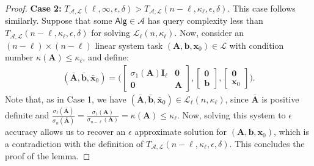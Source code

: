 \documentclass[10pt,a4paper]{amsart}
\def\Ac{{\mathcal A}}
\def\Alg{{\mathsf{Alg}}}
\def\A{{\mathbf A}}
\def\I{{\mathbf I}}
\def\Lc{{\mathcal L}}
\def\b{{\mathbf b}}
\def\x{{\mathbf x}}
\def\zero{{\mathbf 0}}
\begin{document}
\begin{proof}
\noindent
\textbf{Case 2:} $T_{\Ac,\Lc}(\ell,\infty,\epsilon,\delta) > T_{\Ac,\Lc}(n-\ell,\kappa_\ell,\epsilon,\delta)$. This case follows similarly. Suppose that some $\Alg\in\Ac$ has query complexity less than $T_{\Ac,\Lc}(n-\ell,\kappa_\ell,\epsilon,\delta)$ for solving $\Lc_\ell(n,\kappa_\ell)$. Now, consider an $(n-\ell)\times  (n-\ell)$ linear system task $(\A,\b,\x_0)\in\Lc$ with condition number $\kappa(\A)\leq \kappa_\ell$, and define:
\begin{align*}
(\bar\A,\bar\b,\bar\x_0)=\bigg(\begin{bmatrix}
    \sigma_1(\A)\I_{\ell}&\zero\\
    \zero& \A
\end{bmatrix}, 
\begin{bmatrix}
    \zero\\ 
    \b
\end{bmatrix},
\begin{bmatrix}
    \zero\\ 
    \x_0
\end{bmatrix}
\bigg).
\end{align*}
Note that, as in Case 1, we have $(\bar\A,\bar\b,\bar\x_0)\in\Lc_\ell(n,\kappa_\ell)$, since $\bar\A$ is positive definite and $\frac{\sigma_{\ell}(\bar\A)}{\sigma_n(\bar\A)} = \frac{\sigma_1(\A)}{\sigma_{n-\ell}(\A)}= \kappa(\A)\leq \kappa_\ell$. Now, solving this system to $\epsilon$ accuracy allows us to recover an $\epsilon$ approximate solution for $(\A,\b,\x_0)$, which is a contradiction with the definition of $T_{\Ac,\Lc}(n-\ell,\kappa_\ell,\epsilon,\delta)$. This concludes the proof of the lemma.
\end{proof}
\end{document}
